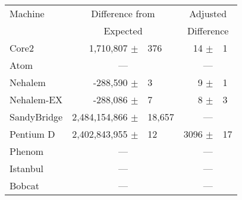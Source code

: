 \begin{tabular}{|l||rl|rl|}

\hline
Machine   & \multicolumn{2}{c|}{Difference from} & \multicolumn{2}{c|}{Adjusted} \\
          & \multicolumn{2}{c|}{Expected}        & \multicolumn{2}{c|}{Difference} \\
\hline
\hline

Core2          &  1,710,807  $\pm$ & 376       &        14   $\pm$ & 1  \\
\hline
Atom           & \multicolumn{2}{c|}{---} &  \multicolumn{2}{c|}{---} \\
\hline
Nehalem        & -288,590    $\pm$ & 3          &         9   $\pm$ & 1  \\
\hline
Nehalem-EX     & -288,086    $\pm$ & 7          &         8   $\pm$ & 3  \\
\hline
SandyBridge    & 2,484,154,866 $\pm$ & 18,657    &  \multicolumn{2}{c|}{---} \\
\hline
Pentium D      & 2,402,843,955 $\pm$ & 12       &      3096   $\pm$ & 17 \\
\hline
Phenom         & \multicolumn{2}{c|}{---} &  \multicolumn{2}{c|}{---} \\
\hline
Istanbul       & \multicolumn{2}{c|}{---} &  \multicolumn{2}{c|}{---} \\
\hline
Bobcat        & \multicolumn{2}{c|}{---} &  \multicolumn{2}{c|}{---} \\
\hline
\end{tabular}
%

